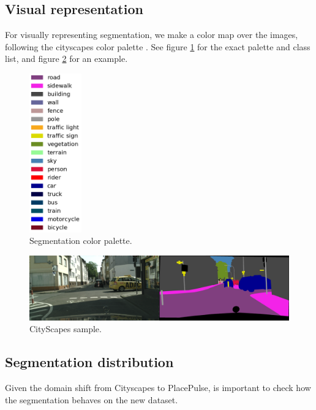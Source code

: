 \subsection{Visual representation}
\label{sec:seg_colors}
For visually representing segmentation, we make a color map over the images, following
the cityscapes color palette \cite{cordts_cityscapes}. See figure \ref{fig:segmentation_colors}
for the exact palette and class list, and figure \ref{fig:cs_sample} for an example.

\begin{figure}[ht]
	\begin{center}
	\includegraphics[width=0.2\textwidth]{./figures/seg_colors.png}
	\caption[Segmentation color palette]{
        Segmentation color palette.
        }
	\label{fig:segmentation_colors}
	\end{center}
\end{figure}

\begin{figure}[ht]
	\begin{center}
	\includegraphics[width=1\textwidth]{./figures/cityscapes_sample.png}
	\caption[CityScapes sample]{
        CityScapes sample.
        }
	\label{fig:cs_sample}
	\end{center}
\end{figure}

\subsection{Segmentation distribution}
\label{sec:seg_distribution}
Given the domain shift from Cityscapes to PlacePulse, is important to check how
the segmentation behaves on the new dataset.

